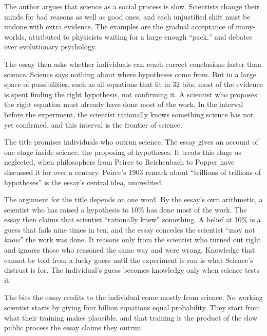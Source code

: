 \begin{afterword}
\summaryhead

The author argues that science as a social process is slow. Scientists change their minds for bad reasons as well as good ones, and each unjustified shift must be undone with extra evidence. The examples are the gradual acceptance of many-worlds, attributed to physicists waiting for a large enough ``pack,'' and debates over evolutionary psychology.

The essay then asks whether individuals can reach correct conclusions faster than science. Science says nothing about where hypotheses come from. But in a large space of possibilities, such as all equations that fit in 32 bits, most of the evidence is spent finding the right hypothesis, not confirming it. A scientist who proposes the right equation must already have done most of the work. In the interval before the experiment, the scientist rationally knows something science has not yet confirmed, and this interval is the frontier of science.

\responsehead

The title promises individuals who outrun science. The essay gives an account of one stage inside science, the proposing of hypotheses. It treats this stage as neglected, when philosophers from Peirce to Reichenbach to Popper have discussed it for over a century. Peirce's 1903 remark about ``trillions of trillions of hypotheses'' is the essay's central idea, uncredited.

The argument for the title depends on one word. By the essay's own arithmetic, a scientist who has raised a hypothesis to 10\% has done most of the work. The essay then claims that scientist ``rationally knew'' something. A belief at 10\% is a guess that fails nine times in ten, and the essay concedes the scientist ``may not \emph{know}'' the work was done. It reasons only from the scientist who turned out right and ignores those who reasoned the same way and were wrong. Knowledge that cannot be told from a lucky guess until the experiment is run is what Science's distrust is for. The individual's guess becomes knowledge only when science tests it.

The bits the essay credits to the individual come mostly from science. No working scientist starts by giving four billion equations equal probability. They start from what their training makes plausible, and that training is the product of the slow public process the essay claims they outrun.


\end{afterword}
